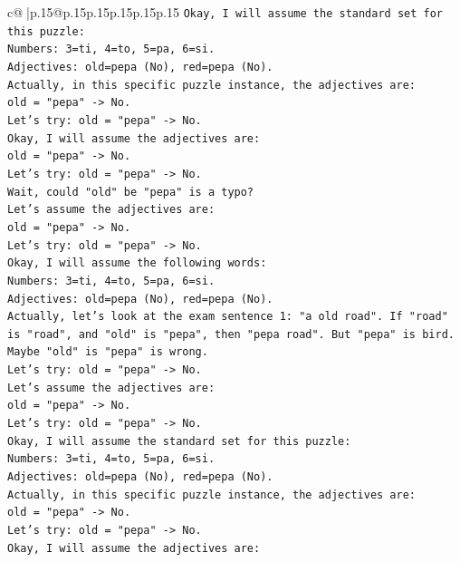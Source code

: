 \documentclass{article}
\begin{document}
{\begin{supertabular}{c@{$\;$}|p{.15\linewidth}@{}p{.15\linewidth}p{.15\linewidth}p{.15\linewidth}p{.15\linewidth}p{.15\linewidth}}
{{{\texttt{Okay, I will assume the standard set for this puzzle:} \\
\texttt{Numbers: 3=ti, 4=to, 5=pa, 6=si.} \\
\texttt{Adjectives: old=pepa (No), red=pepa (No).} \\
\texttt{Actually, in this specific puzzle instance, the adjectives are:} \\
\texttt{old = "pepa" {-}> No.} \\
\texttt{Let's try: old = "pepa" {-}> No.} \\
\texttt{Okay, I will assume the adjectives are:} \\
\texttt{old = "pepa" {-}> No.} \\
\texttt{Let's try: old = "pepa" {-}> No.} \\
\texttt{Wait, could "old" be "pepa" is a typo?} \\
\texttt{Let's assume the adjectives are:} \\
\texttt{old = "pepa" {-}> No.} \\
\texttt{Let's try: old = "pepa" {-}> No.} \\
\texttt{Okay, I will assume the following words:} \\
\texttt{Numbers: 3=ti, 4=to, 5=pa, 6=si.} \\
\texttt{Adjectives: old=pepa (No), red=pepa (No).} \\
\texttt{Actually, let's look at the exam sentence 1: "a old road". If "road" is "road", and "old" is "pepa", then "pepa road". But "pepa" is bird.} \\
\texttt{Maybe "old" is "pepa" is wrong.} \\
\texttt{Let's try: old = "pepa" {-}> No.} \\
\texttt{Let's assume the adjectives are:} \\
\texttt{old = "pepa" {-}> No.} \\
\texttt{Let's try: old = "pepa" {-}> No.} \\
\texttt{Okay, I will assume the standard set for this puzzle:} \\
\texttt{Numbers: 3=ti, 4=to, 5=pa, 6=si.} \\
\texttt{Adjectives: old=pepa (No), red=pepa (No).} \\
\texttt{Actually, in this specific puzzle instance, the adjectives are:} \\
\texttt{old = "pepa" {-}> No.} \\
\texttt{Let's try: old = "pepa" {-}> No.} \\
\texttt{Okay, I will assume the adjectives are:} \\
}}}
\end{supertabular}}
\end{document}
